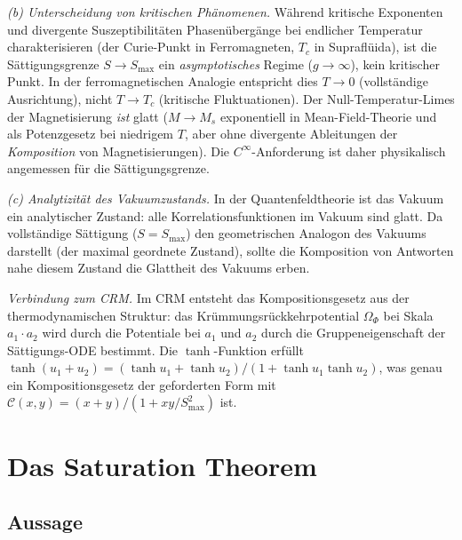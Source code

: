 \documentclass[aps,prd,twocolumn,superscriptaddress,nofootinbib]{revtex4-2}
\begin{document}
\textit{(b) Unterscheidung von kritischen Phänomenen.} Während kritische Exponenten und divergente Suszeptibilitäten Phasenübergänge bei endlicher Temperatur charakterisieren (der Curie-Punkt in Ferromagneten, $T_c$ in Supraflüida), ist die Sättigungsgrenze $S \to S_{\max}$ ein \textit{asymptotisches} Regime ($g \to \infty$), kein kritischer Punkt. In der ferromagnetischen Analogie entspricht dies $T \to 0$ (vollständige Ausrichtung), nicht $T \to T_c$ (kritische Fluktuationen). Der Null-Temperatur-Limes der Magnetisierung \textit{ist} glatt ($M \to M_s$ exponentiell in Mean-Field-Theorie und als Potenzgesetz bei niedrigem $T$, aber ohne divergente Ableitungen der \textit{Komposition} von Magnetisierungen). Die $C^\infty$-Anforderung ist daher physikalisch angemessen für die Sättigungsgrenze.

\textit{(c) Analytizität des Vakuumzustands.} In der Quantenfeldtheorie ist das Vakuum ein analytischer Zustand: alle Korrelationsfunktionen im Vakuum sind glatt. Da vollständige Sättigung ($S = S_{\max}$) den geometrischen Analogon des Vakuums darstellt (der maximal geordnete Zustand), sollte die Komposition von Antworten nahe diesem Zustand die Glattheit des Vakuums erben.

\textit{Verbindung zum CRM.} Im CRM entsteht das Kompositionsgesetz aus der thermodynamischen Struktur: das Krümmungsrückkehrpotential $\Omega_\Phi$ bei Skala $a_1 \cdot a_2$ wird durch die Potentiale bei $a_1$ und $a_2$ durch die Gruppeneigenschaft der Sättigungs-ODE bestimmt. Die $\tanh$-Funktion erfüllt $\tanh(u_1 + u_2) = (\tanh u_1 + \tanh u_2)/(1 + \tanh u_1 \tanh u_2)$, was genau ein Kompositionsgesetz der geforderten Form mit $\mathcal{C}(x,y) = (x + y)/(1 + xy/S_{\max}^2)$ ist.


\section{Das Saturation Theorem}
\label{sec:theorem}

\subsection{Aussage}
\end{document}
